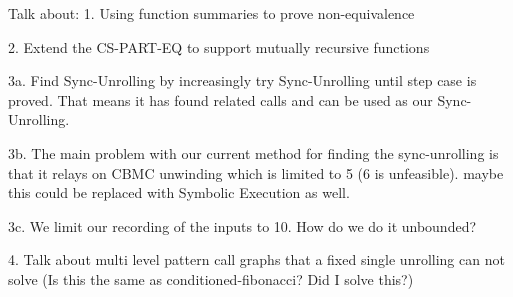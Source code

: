 Talk about:
1. Using function summaries to prove non-equivalence

2. Extend the CS-PART-EQ to support mutually recursive functions

3a. Find Sync-Unrolling by increasingly try Sync-Unrolling until step case is proved. That means it has found related calls and can be used as our Sync-Unrolling. 

3b. The main problem with our current method for finding the sync-unrolling is that it relays on CBMC unwinding which is limited to 5 (6 is unfeasible). 
maybe this could be replaced with Symbolic Execution as well.

3c. We limit our recording of the inputs to 10. How do we do it unbounded?

4. Talk about multi level pattern call graphs that a fixed single unrolling can not solve (Is this the same as conditioned-fibonacci? Did I solve this?)  
 